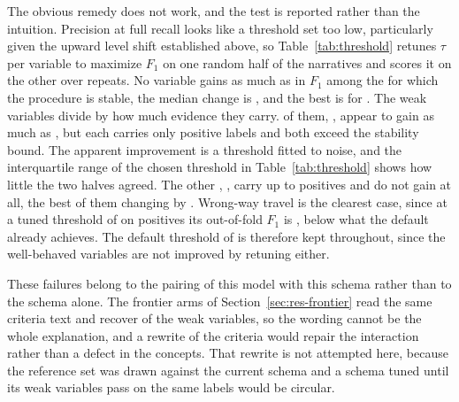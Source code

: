 The obvious remedy does not work, and the test is reported rather than the intuition.
Precision \GoldWorstPrec{} at full recall looks like a threshold set too low, particularly
given the upward level shift established above, so Table~\ref{tab:threshold} retunes $\tau$
per variable to maximize $F_1$ on one random half of the narratives and scores it on the
other over \ThreshRepeats{} repeats. No variable gains as much as \ThreshGainThreshold{} in
$F_1$ among the \ThreshNStable{} for which the procedure is stable, the median change is
\ThreshMedianGain{}, and the best is \ThreshBestGain{} for \ThreshBestGainVar{}. The weak
variables divide by how much evidence they carry. \ThreshWeakNThin{} of them,
\ThreshWeakThinVars{}, appear to gain as much as \ThreshWeakThinBestGain{}, but each carries
only \ThreshWeakNPosMin{} positive labels and both exceed the stability bound. The apparent
improvement is a threshold fitted to noise, and the interquartile range of the chosen threshold
in Table~\ref{tab:threshold} shows how little the two halves agreed. The other
\ThreshWeakNThick{}, \ThreshWeakThickVars{}, carry up to \ThreshWeakNPosMax{} positives and do
not gain at all, the best of them changing by \ThreshWeakThickBestGain{}. Wrong-way travel is
the clearest case, since at a tuned threshold of \ThreshWrongWayTau{} on
\ThreshWrongWayNPos{} positives its out-of-fold $F_1$ is \ThreshWrongWayOof{}, below what the
default already achieves. The default threshold of \TauGate{} is therefore kept throughout,
since the well-behaved variables are not improved by retuning either.

These failures belong to the pairing of this model with this schema rather than to the schema
alone. The frontier arms of Section~\ref{sec:res-frontier} read the same criteria text and
recover \FrontierNRecovered{} of the \GoldNWeak{} weak variables, so the wording cannot be the
whole explanation, and a rewrite of the criteria would repair the interaction rather than a
defect in the concepts. That rewrite is not attempted here, because the reference set was
drawn against the current schema and a schema tuned until its weak variables pass on the same
labels would be circular.



